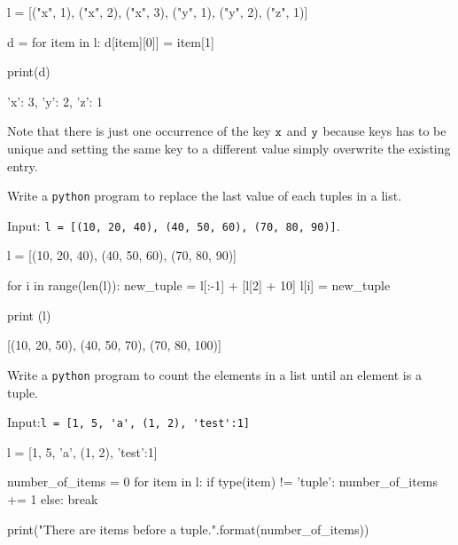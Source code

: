 \cprotEnv\begin{solution}
\begin{ipython}
l = [("x", 1), ("x", 2), ("x", 3), ("y", 1), ("y", 2), ("z", 1)]

d = {}
for item in l:
    d[item][0]] = item[1]
    
print(d)

{'x': 3, 'y': 2, 'z': 1}
\end{ipython}
Note that there is just one occurrence of the key $\tt{x}$ and $\tt{y}$ because keys has to be unique and setting the same key to a different value simply overwrite the existing entry.
\end{solution}

\begin{question}
Write a \texttt{python} program to replace the last value of each tuples in a list.

\noindent
Input: \lstinline[language=iPython]|l = [(10, 20, 40), (40, 50, 60), (70, 80, 90)]|.
\end{question}

\cprotEnv\begin{solution}
\begin{ipython}
l = [(10, 20, 40), (40, 50, 60), (70, 80, 90)]

for i in range(len(l)):
    new_tuple = l[:-1] + [l[2] + 10]
    l[i] = new_tuple
    
print (l)

[(10, 20, 50), (40, 50, 70), (70, 80, 100)]
\end{ipython}
\end{solution}

\begin{question}
Write a \texttt{python} program to count the elements in a list until an element is a tuple.

\noindent
Input:\lstinline[language=iPython]|l = [1, 5, 'a', (1, 2), 'test':1]|
\end{question}

\cprotEnv\begin{solution}
\begin{ipython}
l = [1, 5, 'a', (1, 2), 'test':1]

number_of_items = 0 
for item in l:
    if type(item) != 'tuple'{:}
        number_of_items += 1
    else:
        break
        
print("There are {} items before a tuple.".format(number_of_items))
\end{ipython}
\end{solution}

